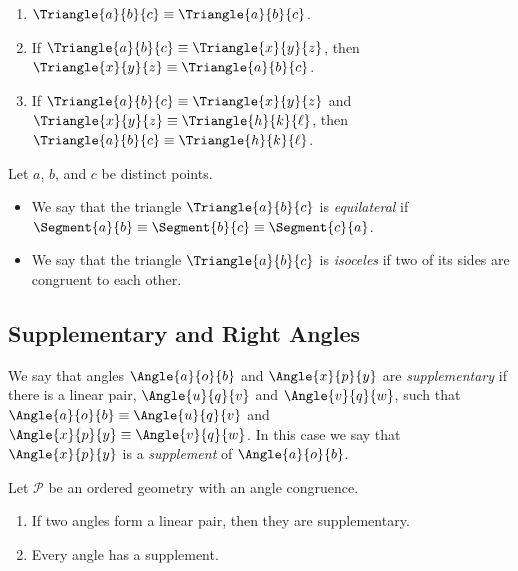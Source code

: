 \documentclass{article}
\begin{document}
\begin{prop} \mbox{}
\begin{enumerate}
\item $\Triangle{a}{b}{c} \equiv \Triangle{a}{b}{c}$.
\item If $\Triangle{a}{b}{c} \equiv \Triangle{x}{y}{z}$, then $\Triangle{x}{y}{z} \equiv \Triangle{a}{b}{c}$.
\item If $\Triangle{a}{b}{c} \equiv \Triangle{x}{y}{z}$ and $\Triangle{x}{y}{z} \equiv \Triangle{h}{k}{\ell}$, then $\Triangle{a}{b}{c} \equiv \Triangle{h}{k}{\ell}$.
\end{enumerate}
\end{prop}

\begin{dfn}
Let $a$, $b$, and $c$ be distinct points.
\begin{itemize}
\item We say that the triangle $\Triangle{a}{b}{c}$ is \emph{equilateral} if $\Segment{a}{b} \equiv \Segment{b}{c} \equiv \Segment{c}{a}$.
\item We say that the triangle $\Triangle{a}{b}{c}$ is \emph{isoceles} if two of its sides are congruent to each other.
\end{itemize}
\end{dfn}

\subsection*{Supplementary and Right Angles}

\begin{dfn}
We say that angles $\Angle{a}{o}{b}$ and $\Angle{x}{p}{y}$ are \emph{supplementary} if there is a linear pair, $\Angle{u}{q}{v}$ and $\Angle{v}{q}{w}$, such that $\Angle{a}{o}{b} \equiv \Angle{u}{q}{v}$ and $\Angle{x}{p}{y} \equiv \Angle{v}{q}{w}$. In this case we say that $\Angle{x}{p}{y}$ is a \emph{supplement} of $\Angle{a}{o}{b}$.
\end{dfn}

\begin{prop}
Let $\mathcal{P}$ be an ordered geometry with an angle congruence.
\begin{enumerate}
\item If two angles form a linear pair, then they are supplementary.
\item Every angle has a supplement.
\end{enumerate}
\end{prop}
\end{document}
